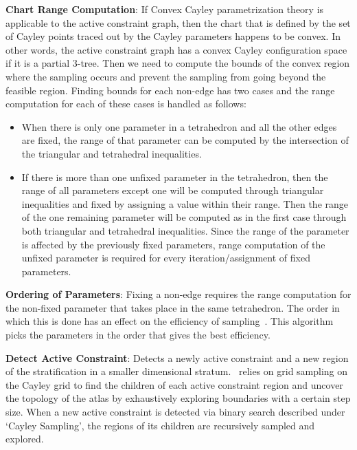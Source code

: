 \textbf{Chart Range Computation}: If Convex Cayley parametrization theory is
applicable to the active constraint graph, then the chart that is defined by
the set of Cayley points traced out by the Cayley parameters happens to be
convex. In other words, the active constraint graph has a convex Cayley
configuration space if it is a partial 3-tree. Then we need to compute the
bounds of the convex region where the sampling occurs and prevent the sampling
from going beyond the feasible region. Finding bounds for each non-edge has two cases
and the range computation for each of these cases is handled as follows:
\begin{itemize}
		\item When there is only one parameter in a tetrahedron and all the
				other edges are fixed, the range of that parameter can be
				computed by the intersection of the triangular and tetrahedral
				inequalities.
		\item If there is more than one unfixed parameter in the tetrahedron,
				then the range of all parameters except one will be computed
				through triangular inequalities and fixed by assigning a value
				within their range. Then the range of the one remaining
				parameter will be computed as in the first case through both
				triangular and tetrahedral inequalities. Since the range of
				the parameter is affected by the previously fixed parameters,
				range computation of the unfixed parameter is required
				for every iteration/assignment of fixed parameters.
\end{itemize}

\textbf{Ordering of Parameters}: Fixing a non-edge requires the range
computation for the non-fixed parameter that takes place in the same
tetrahedron. The order in which this is done has an effect on the efficiency
of sampling~\cite{ugandhar}. This algorithm picks the parameters in the order
that gives the best efficiency.

\textbf{Detect Active Constraint}: Detects a newly active constraint and a new
region of the stratification in a smaller dimensional stratum. \EASAL~relies on
grid sampling on the Cayley grid to find the children of each active constraint
region and uncover the topology of the atlas by exhaustively exploring
boundaries with a certain step size. When a new active constraint is detected
via binary search described under `Cayley Sampling', the regions of its children
are recursively sampled and explored.



